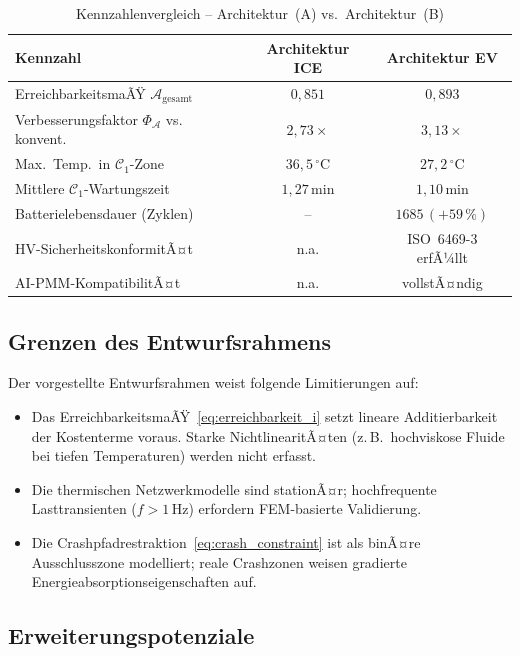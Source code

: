 ﻿\documentclass[12pt,a4paper]{article}
\begin{document}
\begin{table}[H]
	\centering
	\caption{Kennzahlenvergleich -- Architektur~(A) vs.\ Architektur~(B)}
	\label{tab:architektur_vergleich}
	\begin{tabular}{lcc}
		\toprule
		\textbf{Kennzahl} & \textbf{Architektur ICE} & \textbf{Architektur EV} \\
		\midrule
		ErreichbarkeitsmaÃŸ $\mathcal{A}_\mathrm{gesamt}$ & $0{,}851$ & $0{,}893$ \\
		Verbesserungsfaktor $\Phi_\mathcal{A}$ vs. konvent. & $2{,}73\times$ & $3{,}13\times$ \\
		Max.\ Temp.\ in $\mathcal{C}_1$-Zone & $36{,}5\,^\circ$C & $27{,}2\,^\circ$C \\
		Mittlere $\mathcal{C}_1$-Wartungszeit & $1{,}27\,\mathrm{min}$ & $1{,}10\,\mathrm{min}$ \\
		Batterielebensdauer (Zyklen) & -- & $1685\,(+59\,\%)$ \\
		HV-SicherheitskonformitÃ¤t & n.a. & ISO~6469-3 erfÃ¼llt \\
		AI-PMM-KompatibilitÃ¤t & n.a. & vollstÃ¤ndig \\
		\bottomrule
	\end{tabular}
\end{table}

\subsection{Grenzen des Entwurfsrahmens}

Der vorgestellte Entwurfsrahmen weist folgende Limitierungen auf:

\begin{itemize}[leftmargin=*]
	\item Das ErreichbarkeitsmaÃŸ~\eqref{eq:erreichbarkeit_i} setzt lineare
	Additierbarkeit der Kostenterme voraus. Starke NichtlinearitÃ¤ten (z.\,B.\
	hochviskose Fluide bei tiefen Temperaturen) werden nicht erfasst.
	\item Die thermischen Netzwerkmodelle sind stationÃ¤r; hochfrequente
	Lasttransienten ($f > 1\,\mathrm{Hz}$) erfordern FEM-basierte Validierung.
	\item Die Crashpfadrestraktion~\eqref{eq:crash_constraint} ist als
	binÃ¤re Ausschlusszone modelliert; reale Crashzonen weisen gradierte
	Energieabsorptionseigenschaften auf.
\end{itemize}

\subsection{Erweiterungspotenziale}
\end{document}
